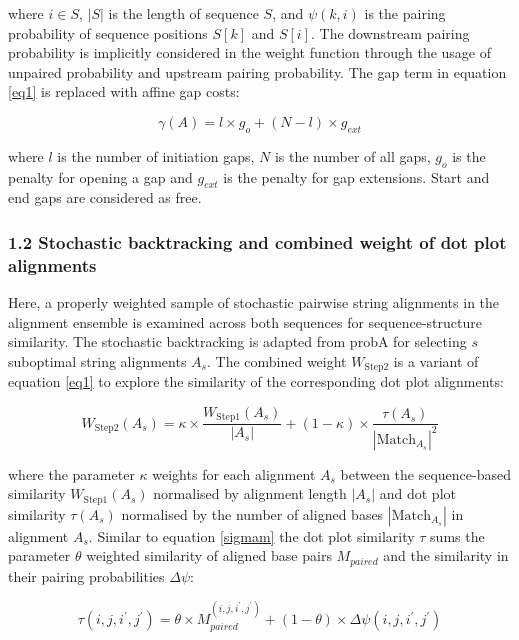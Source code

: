 \documentclass{bmcart}
\begin{document}
\noindent where $i \in S$, $|S|$ is the length of sequence $S$, and $\psi(k,i)$ is the
pairing probability of sequence positions $S[k]$ and $S[i]$. The downstream
pairing probability is implicitly considered in the weight function through the
usage of unpaired probability and upstream pairing probability. The gap term
in equation \ref{eq1} is replaced with affine gap costs:

\begin{equation}\label{eq6}
	\gamma(A) = l \times g_o + (N-l) \times g_{ext}
\end{equation}
	
\noindent where $l$ is the number of initiation gaps, $N$ is the number of all gaps,
$g_o$ is the penalty for opening a gap and $g_{ext}$ is the penalty for gap
extensions. Start and end gaps are considered as free.\\

\subsubsection*{1.2 Stochastic backtracking and combined weight of dot plot alignments}

Here, a properly weighted sample of stochastic pairwise string alignments
in the alignment ensemble is examined across both sequences for sequence-structure similarity.
The stochastic backtracking is adapted from probA \cite{Muckstein12385998} for
selecting $s$ suboptimal string alignments $A_s$.  The combined weight
$W_{\mbox{Step2}}$ is a variant of equation \ref{eq1} to explore the similarity
of the corresponding dot plot alignments:

\begin{equation}\label{eq7}
	W_{\mbox{Step2}}(A_s) = \kappa \times \frac{W_{\mbox{Step1}}(A_s)}{|A_s|} + (1-\kappa) \times
	\frac{\tau(A_s)}{{|\mbox{Match}_{A_s}|}^2}
\end{equation}

\noindent where the parameter $\kappa$ weights for each alignment $A_s$ between the
sequence-based similarity $W_{\mbox{Step1}}(A_s)$ normalised by alignment
length $|A_s|$ and dot plot similarity $\tau(A_s)$ normalised by the number of
aligned bases $|\mbox{Match}_{A_s}|$ in alignment $A_s$. Similar to equation
\ref{sigmam} the dot plot similarity $\tau$ sums the parameter $\theta$ weighted
similarity of aligned base pairs $M_{paired}$ and the similarity in their
pairing probabilities $\Delta \psi$:

\begin{equation}\label{eq8}
	\tau(i,j,i^\prime,j^\prime) = \theta \times M_{paired}^{(i,j,i^\prime,j^\prime)}
	+ (1-\theta) \times \Delta \psi(i,j,i^\prime,j^\prime)
\end{equation}
\end{document}
